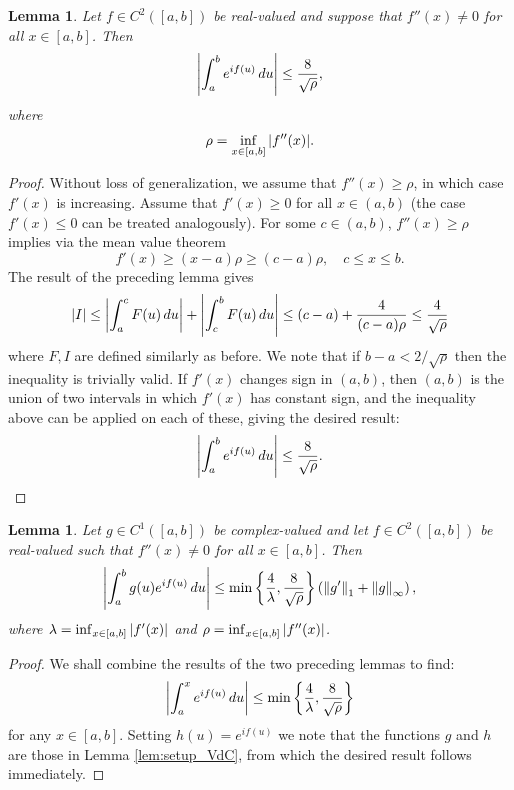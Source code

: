 \documentclass[11pt, letter]{book}
\newtheorem{lemma}[theorem]{Lemma}
\newcommand{\lp}{\left(}
\newcommand{\rp}{\right)}
\newcommand{\lc}{\left\{}
\newcommand{\rc}{\right\}}
\newcommand{\f}[2]{\frac{#1}{#2}}
\begin{document}
\begin{framed}
\begin{lemma}
Let $f\in C^2([a,b])$ be real-valued and suppose that $f''(x) \neq 0$ for all $x\in [a,b]$. Then
\begin{equation*}
    \abs{\int^b_a e^{if(u)}\,du} \leq \f{8}{\sqrt{\rho}},
\end{equation*}
where
\begin{equation*}
    \rho = \inf_{x\in [a,b]}\abs{f''(x)}.
\end{equation*}
\end{lemma}
\end{framed}
\begin{proof}
Without loss of generalization, we assume that $f''(x) \geq \rho$, in which case $f'(x)$ is increasing. Assume that $f'(x)\geq 0$ for all $x\in (a,b)$ (the case $f'(x) \leq 0$ can be treated analogously). For some $c\in (a,b)$, $f''(x) \geq \rho$ implies via the mean value theorem
\begin{equation*}
    f'(x) \geq (x-a)\rho \geq (c-a)\rho, \quad c\leq x \leq b.
\end{equation*}
The result of the preceding lemma gives 
\begin{equation*}
    \abs{I} \leq \abs{\int^c_a F(u)\,du} + \abs{\int^b_c F(u)\,du} \leq (c-a) + \f{4}{(c-a)\rho} \leq \f{4}{\sqrt{\rho}}
\end{equation*}
where $F,I$ are defined similarly as before. We note that if $b-a < 2/\sqrt{\rho}$ then the inequality is trivially valid. If $f'(x)$ changes sign in $(a,b)$, then $(a,b)$ is the union of two intervals in which $f'(x)$ has constant sign, and the inequality above can be applied on each of these, giving the desired result:
\begin{equation*}
    \abs{\int^b_a e^{if(u)}\,du} \leq \f{8}{\sqrt{\rho}}.
\end{equation*}
\end{proof}
\begin{framed}
\begin{lemma}\label{lem:VdC_2}
Let $g\in C^1([a,b])$ be complex-valued and let $f\in C^2([a,b])$ be real-valued such that $f''(x) \neq 0$ for all $x\in [a,b]$. Then
\begin{equation*}
    \abs{\int^b_a g(u) e^{if(u)}\,du} \leq \min \lc \f{4}{\lambda}, \f{8}{\sqrt{\rho}}  \rc \lp \norm{g'}_1 + \norm{g}_\infty \rp,
\end{equation*}
where $\lambda = \inf_{x\in [a,b]} \abs{f'(x)}$ and $\rho = \inf_{x\in [a,b]} \abs{f''(x)}$. 
\end{lemma}
\end{framed}
\begin{proof}
We shall combine the results of the two preceding lemmas to find:
\begin{equation*}
    \abs{\int^x_a e^{if(u)}\,du} \leq \min \lc \f{4}{\lambda}, \f{8}{\sqrt{\rho}} \rc
\end{equation*}
for any $x\in [a,b]$. Setting $h(u) = e^{if(u)}$ we note that the functions $g$ and $h$ are those in Lemma \ref{lem:setup_VdC}, from which the desired result follows immediately. 
\end{proof}
\end{document}
